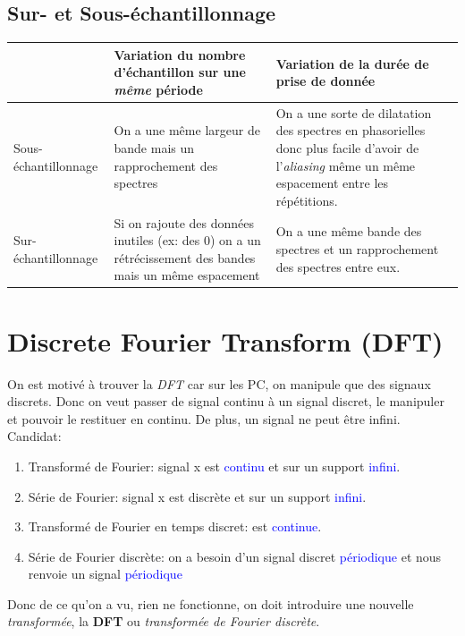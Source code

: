 \documentclass{report}
\begin{document}
\section{Sur- et Sous-échantillonnage}
\begin{tabular}{| m{3cm} | m{5cm} | m{5cm} |}
\hline
\cellcolor[rgb]{0.8, 0.8, 0.8} & \cellcolor[rgb]{0.8, 0.8, 0.8} Variation du nombre d'échantillon sur une \textit{même} période & \cellcolor[rgb]{0.8, 0.8, 0.8} Variation de la durée de prise de donnée\\
\hline
\cellcolor[rgb]{0.8, 0.8, 0.8} Sous-échantillonnage & On a une même largeur de bande mais un rapprochement des spectres & On a une sorte de dilatation des spectres en phasorielles donc plus facile d'avoir de l'\textit{aliasing} même un même espacement entre les répétitions.\\ 
\hline
\cellcolor[rgb]{0.8, 0.8, 0.8} Sur-échantillonnage & Si on rajoute des données inutiles (ex: des 0) on a un rétrécissement des bandes mais un même espacement & On a une même bande des spectres et un rapprochement des spectres entre eux. \\
\hline
\end{tabular}

\chapter{Discrete Fourier Transform (DFT)} 
On est motivé à trouver la \textit{DFT} car sur les PC, on manipule que des signaux discrets. Donc on veut passer de signal continu à un signal discret, le manipuler et pouvoir le restituer en continu. De plus, un signal ne peut être infini.\\
Candidat:
\begin{enumerate}
\item Transformé de Fourier: signal x est \textcolor{blue}{continu} et sur un support \textcolor{blue}{infini}.
\item Série de Fourier: signal x est discrète et sur un support \textcolor{blue}{infini}.
\item Transformé de Fourier en temps discret: est \textcolor{blue}{continue}.
\item Série de Fourier discrète: on a besoin d'un signal discret \textcolor{blue}{périodique} et nous renvoie un signal \textcolor{blue}{périodique}
\end{enumerate}
Donc de ce qu'on a vu, rien ne fonctionne, on doit introduire une nouvelle \textit{transformée}, la \textbf{DFT} ou \textit{transformée de Fourier discrète}.
\end{document}
